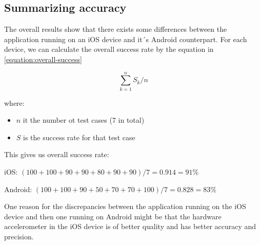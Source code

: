 \documentclass[12pt, a4paper, onecolumn]{article}
\begin{document}
			
			
		\subsection{Summarizing accuracy}
		The overall results show that there exists some differences between the application running on an iOS device and it´s Android counterpart. For each device, we can calculate the overall success rate by the equation in \ref{equation:overall-success}
		
		\begin{equation}
			\label{equation:overall-success}
			\sum_{k=1}^{n} S_{k} / n
		\end{equation}
		
		where:
		\begin{itemize}
			\item $n$ it the number ot test cases (7 in total)
			\item  $S$ is the success rate for that test case
		\end{itemize}
			
		
		This gives us overall success rate: 
		
		iOS: $(100 + 100 + 90 + 90 + 80 + 90 + 90) / 7 = 0.914 = 91\%$
		
		
		Android: $(100 +100 +90 +50 +70  + 70 + 100) / 7 = 0.828 = 83\%$
		
		
		One reason for the discrepancies between the application running on the iOS device and then one running on Android might be that the hardware accelerometer in the iOS device is of better quality and has better accuracy and precision. 
		
\end{document}
